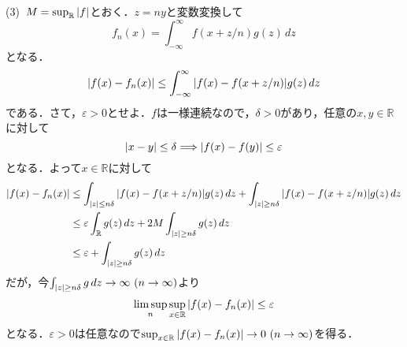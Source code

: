 \documentclass[a4j]{ltjsarticle}
\newcommand{\Rset}{\mathbb{R}}
\newcommand{\1}{\mathbbm{1}}
\numberwithin{equation}{section}
\theoremstyle{definition}
\begin{document}
(3)\ $M=\sup_{\Rset}\abs{f}$とおく．$z=ny$と変数変換して
\begin{equation}
    f_n(x)=\int_{-\infty}^{\infty} f(x+z/n)g(z)\,dz 
\end{equation}
となる．
\begin{align}
    \abs{f(x)-f_n(x)}\leq \int_{-\infty}^\infty \abs{f(x)-f(x+z/n)}g(z)\,dz 
\end{align}
である．さて，$\varepsilon>0$とせよ．$f$は一様連続なので，$\delta>0$があり，任意の$x,y\in \Rset$に対して
\begin{equation}
    \abs{x-y}\leq \delta\Longrightarrow \abs{f(x)-f(y)}\leq \varepsilon 
\end{equation}
となる．よって$x\in\Rset$に対して
\begin{align}
    \abs{f(x)-f_n(x)}&\leq \int_{\abs{z}\leq n\delta}\abs{f(x)-f(x+z/n)}g(z)\,dz+\int_{\abs{z}\geq n\delta} \abs{f(x)-f(x+z/n)}g(z)\,dz\\
    &\leq \varepsilon\int_{\Rset}g(z)\,dz+2M\int_{\abs{z}\geq n\delta}g(z)\,dz \\
    &\leq \varepsilon+\int_{\abs{z}\geq n\delta}g(z)\,dz 
\end{align}
だが，今$\int_{\abs{z}\geq n\delta}g\,dz\to \infty \ (n\to\infty)$より 
\begin{equation}
    \limsup_{n}\sup_{x\in\Rset}\abs{f(x)-f_n(x)}\leq \varepsilon 
\end{equation}
となる．$\varepsilon>0$は任意なので$\sup_{x\in\Rset}\abs{f(x)-f_n(x)}\to0\ (n\to\infty)$を得る．
\end{document}
